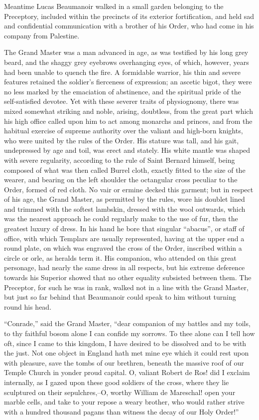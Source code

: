 Meantime Lucas Beaumanoir walked in a small garden belonging to the
Preceptory, included within the precincts of its exterior fortification,
and held sad and confidential communication with a brother of his Order,
who had come in his company from Palestine.

The Grand Master was a man advanced in age, as was testified by his long
grey beard, and the shaggy grey eyebrows overhanging eyes, of which,
however, years had been unable to quench the fire. A formidable warrior,
his thin and severe features retained the soldier's fierceness of
expression; an ascetic bigot, they were no less marked by the emaciation
of abstinence, and the spiritual pride of the self-satisfied devotee.
Yet with these severer traits of physiognomy, there was mixed somewhat
striking and noble, arising, doubtless, from the great part which his
high office called upon him to act among monarchs and princes, and from
the habitual exercise of supreme authority over the valiant and
high-born knights, who were united by the rules of the Order. His
stature was tall, and his gait, undepressed by age and toil, was erect
and stately. His white mantle was shaped with severe regularity,
according to the rule of Saint Bernard himself, being composed of what
was then called Burrel cloth, exactly fitted to the size of the wearer,
and bearing on the left shoulder the octangular cross peculiar to the
Order, formed of red cloth. No vair or ermine decked this garment; but
in respect of his age, the Grand Master, as permitted by the rules, wore
his doublet lined and trimmed with the softest lambskin, dressed with
the wool outwards, which was the nearest approach he could regularly
make to the use of fur, then the greatest luxury of dress. In his hand
he bore that singular ``abacus'', or staff of office, with which
Templars are usually represented, having at the upper end a round plate,
on which was engraved the cross of the Order, inscribed within a circle
or orle, as heralds term it. His companion, who attended on this great
personage, had nearly the same dress in all respects, but his extreme
deference towards his Superior showed that no other equality subsisted
between them. The Preceptor, for such he was in rank, walked not in a
line with the Grand Master, but just so far behind that Beaumanoir could
speak to him without turning round his head.

``Conrade,'' said the Grand Master, ``dear companion of my battles and
my toils, to thy faithful bosom alone I can confide my sorrows. To thee
alone can I tell how oft, since I came to this kingdom, I have desired
to be dissolved and to be with the just. Not one object in England hath
met mine eye which it could rest upon with pleasure, save the tombs of
our brethren, beneath the massive roof of our Temple Church in yonder
proud capital. O, valiant Robert de Ros! did I exclaim internally, as I
gazed upon these good soldiers of the cross, where they lie sculptured
on their sepulchres,--O, worthy William de Mareschal! open your marble
cells, and take to your repose a weary brother, who would rather strive
with a hundred thousand pagans than witness the decay of our Holy
Order!''

